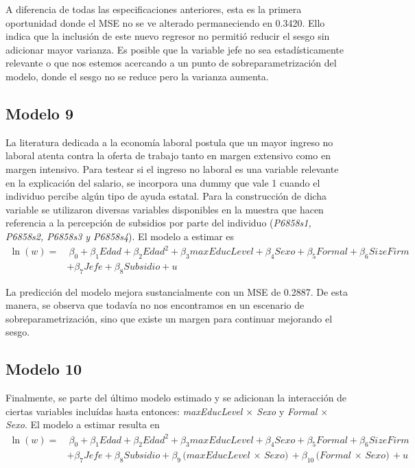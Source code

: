 \documentclass[11pt, a4paper]{article}
\begin{document}
A diferencia de todas las especificaciones anteriores, esta es la primera oportunidad donde el MSE no se ve alterado permaneciendo en 0.3420. Ello indica que la inclusión de este nuevo regresor no permitió reducir el sesgo sin adicionar mayor varianza. Es posible que la variable jefe no sea estadísticamente relevante o que nos estemos acercando a un punto de sobreparametrización del modelo, donde el sesgo no se reduce pero la varianza aumenta. 

\subsection{Modelo 9}

La literatura dedicada a la economía laboral postula que un mayor ingreso no laboral atenta contra la oferta de trabajo tanto en margen extensivo como en margen intensivo. Para testear si el ingreso no laboral es una variable relevante en la explicación del salario, se incorpora una dummy que vale 1 cuando el individuo percibe algún tipo de ayuda estatal. Para la construcción de dicha variable se utilizaron diversas variables disponibles en la muestra que hacen referencia a la percepción de subsidios por parte del individuo (\textit{P6858s1, P6858s2, P6858s3 y P6858s4}).  El modelo a estimar es
\begin{equation*}
\begin{aligned}
\ln(w) = &\ \beta_0 + \beta_1 \textit{Edad} + \beta_2 \textit{Edad}^2 + \beta_3 \textit{maxEducLevel} 
         + \beta_4 \textit{Sexo} + \beta_5 \textit{Formal} + \beta_6 \textit{SizeFirm} \\
         &+ \beta_7 \textit{Jefe} + \beta_8 \textit{Subsidio} + u
\end{aligned}
\end{equation*}

La predicción del modelo mejora sustancialmente con un MSE de 0.2887. De esta manera, se observa que todavía no nos encontramos en un escenario de sobreparametrización, sino que existe un margen para continuar mejorando el sesgo. 


\subsection{Modelo 10}

Finalmente, se parte del último modelo estimado y se adicionan la interacción de ciertas variables incluídas hasta entonces: \textit{maxEducLevel $\times$ Sexo} y \textit{Formal $\times$ Sexo}.  El modelo a estimar resulta en 
\begin{equation*}
\begin{aligned}
\ln(w) = &\ \beta_0 + \beta_1 \textit{Edad} + \beta_2 \textit{Edad}^2 + \beta_3 \textit{maxEducLevel} 
         + \beta_4 \textit{Sexo} + \beta_5 \textit{Formal} + \beta_6 \textit{SizeFirm} \\
         &+ \beta_7 \textit{Jefe} + \beta_8 \textit{Subsidio} + \beta_9 \textit{(maxEducLevel $\times$ Sexo)} 
         + \beta_{10} \textit{(Formal $\times$ Sexo)} + u
\end{aligned}
\end{equation*}
\end{document}

